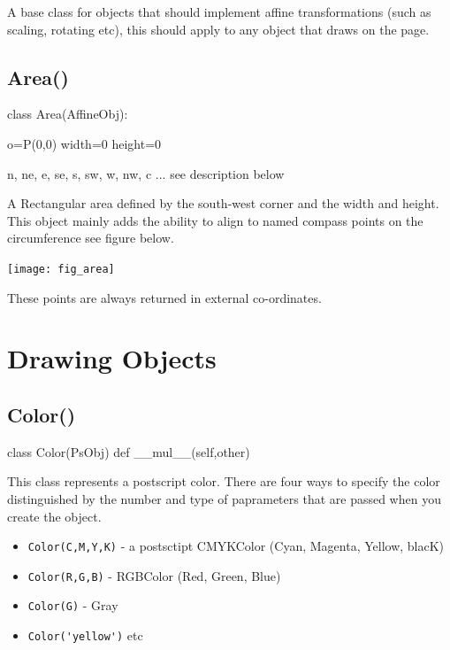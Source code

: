 \documentclass[a4paper]{book}
\begin{document}
A base class for objects that should implement affine transformations
(such as scaling, rotating etc), this should apply to any object that
draws on the page.


\subsection{Area()}
\label{sec:area}
\begin{python}
class Area(AffineObj):

    o=P(0,0)
    width=0
    height=0

    n, ne, e, se, s, sw, w, nw, c  ... see description below
\end{python}

A Rectangular area defined by the south-west corner and the width and height.
This object mainly adds the ability to align to named compass points on the 
circumference see figure below.

\begin{center}
  \texttt{[image: fig\_area]}
\end{center}

These points are always returned in external co-ordinates.

\section{Drawing Objects}

\subsection{Color()}
\label{sec:color}
\begin{python}
class Color(PsObj)
    def __mul__(self,other)
\end{python}

This class represents a postscript color. There are four ways to specify
the color distinguished by the number and type of paprameters that
are passed when you create the object.

\begin{itemize}
\item \Verb|Color(C,M,Y,K)| - a postsctipt CMYKColor (Cyan, Magenta, Yellow, blacK) 
\item \Verb|Color(R,G,B)| - RGBColor (Red, Green, Blue)
\item \Verb|Color(G)| - Gray
\item \Verb|Color('yellow')| etc
\end{itemize}
\end{document}
